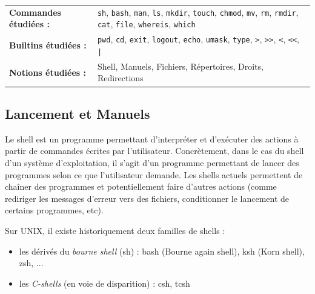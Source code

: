 \newcommand{\defaultparindent}{\parindent}
\setlength{\parindent}{0pt}				%

\begin{center}
\begin{tabular}{p{5cm} p{11cm}}
\textbf{Commandes étudiées :} & \texttt{sh}, \texttt{bash}, \texttt{man}, \texttt{ls}, \texttt{mkdir}, \texttt{touch}, \texttt{chmod}, \texttt{mv}, \texttt{rm}, \texttt{rmdir}, \texttt{cat}, \texttt{file}, \texttt{whereis}, \texttt{which}\\

\textbf{Builtins étudiées :} & \texttt{pwd}, \texttt{cd}, \texttt{exit}, \texttt{logout}, \texttt{echo}, \texttt{umask}, \texttt{type}, \texttt{>}, \texttt{>{}>}, \texttt{<}, \texttt{<{}<}, \texttt{|}\\

\textbf{Notions étudiées :} & Shell, Manuels, Fichiers, Répertoires, Droits, Redirections\\
\end{tabular}
\end{center}

\bigskip

\subsection{Lancement et Manuels}

\bigskip

Le shell est un programme permettant d'interpréter et d'exécuter des actions à partir de commandes écrites par l'utilisateur.
Concrètement, dans le cas du shell d'un système d'exploitation, il s'agit d'un programme permettant de lancer des programmes selon ce que l'utilisateur demande.
Les shells actuels permettent de chaîner des programmes et potentiellement faire d'autres actions (comme rediriger les messages d'erreur vers des fichiers, conditionner le lancement de certains programmes, etc).

\bigskip

Sur UNIX, il existe historiquement deux familles de shells :
\begin{itemize}
\item les dérivés du \textit{bourne shell} (sh) : bash (Bourne again shell), ksh (Korn shell), zsh, ...
\item les \textit{C-shells} (en voie de disparition) : csh, tcsh
\end{itemize}

